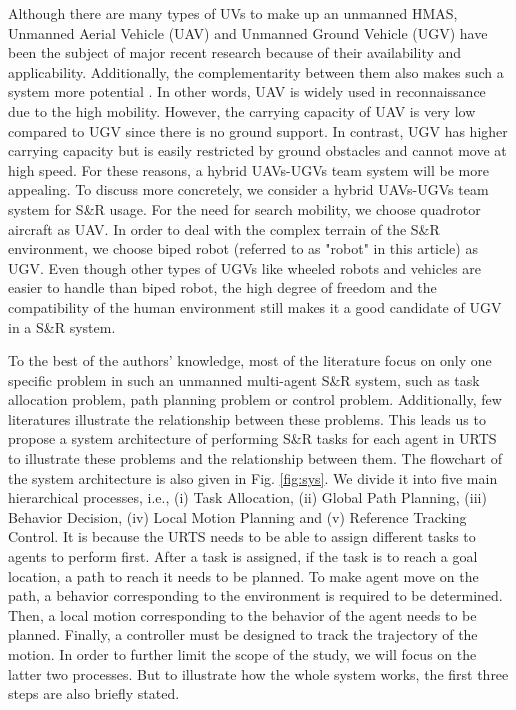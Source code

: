 \documentclass[journal,12pt,onecolumn,draftclsnofoot,]{IEEEtran}
\begin{document}
Although there are many types of UVs to make up an unmanned HMAS, Unmanned Aerial Vehicle (UAV) and Unmanned Ground Vehicle (UGV) have been the subject of major recent research because of their availability and applicability. Additionally, the complementarity between them also makes such a system more potential \cite{arbanas2018decentralized}. In other words, UAV is widely used in reconnaissance due to the high mobility. However, the carrying capacity of UAV is very low compared to UGV since there is no ground support. In contrast, UGV has higher carrying capacity but is easily restricted by ground obstacles and cannot move at high speed. For these reasons, a hybrid UAVs-UGVs team system will be more appealing. To discuss more concretely, we consider a hybrid UAVs-UGVs team system for S\&R usage. For the need for search mobility, we choose quadrotor aircraft as UAV. In order to deal with the complex terrain of the S\&R environment, we choose biped robot (referred to as "robot" in this article) as UGV. Even though other types of UGVs like wheeled robots and vehicles are easier to handle than biped robot, the high degree of freedom and the compatibility of the human environment still makes it a good candidate of UGV in a S\&R system.

To the best of the authors' knowledge, most of the literature focus on only one specific problem in such an unmanned multi-agent S\&R system, such as task allocation problem, path planning problem or control problem. Additionally, few literatures illustrate the relationship between these problems. This leads us to propose a system architecture of performing S\&R tasks for each agent in URTS to illustrate these problems and the relationship between them. The flowchart of the system architecture is also given in Fig. \ref{fig:sys}. We divide it into five main hierarchical processes, i.e., (i) Task Allocation, (ii) Global Path Planning, (iii) Behavior Decision, (iv) Local Motion Planning and (v) Reference Tracking Control. It is because the URTS needs to be able to assign different tasks to agents to perform first. After a task is assigned, if the task is to reach a goal location, a path to reach it needs to be planned. To make agent move on the path, a behavior corresponding to the environment is required to be determined. Then, a local motion corresponding to the behavior of the agent needs to be planned. Finally, a controller must be designed to track the trajectory of the motion. In order to further limit the scope of the study, we will focus on the latter two processes. But to illustrate how the whole system works, the first three steps are also briefly stated.
\end{document}
